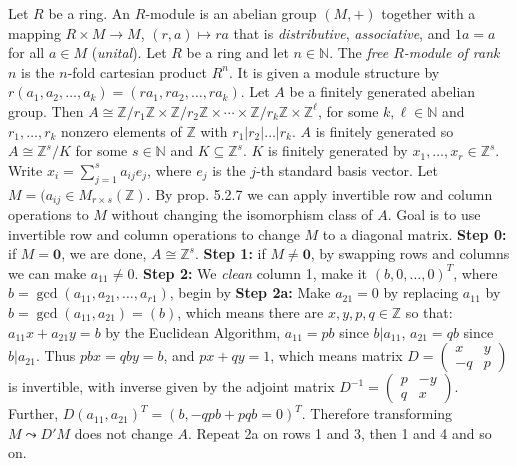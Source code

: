  Let $R$ be a ring. An $R$-module is an abelian group $(M,+)$ together with a mapping $R \times M \to M$, $(r, a)\mapsto ra$ that is \textit{distributive}, \textit{associative}, and $1a =a $ for all $a \in M$ (\textit{unital}).
 Let $R$ be a ring and let $n \in \mathbb{N}$. The \emph{free $R$-module of rank $n$} is the $n$-fold cartesian product $R^n$. It is given a module structure by $r(a_1, a_2, \ldots, a_k) = (ra_1, ra_2, \ldots, ra_k)$.
 Let $A$ be a finitely generated abelian group. Then $A \cong \mathbb{Z}/r_1\mathbb{Z} \times \mathbb{Z}/r_2\mathbb{Z} \times \cdots \times \mathbb{Z}/r_k\mathbb{Z} \times \mathbb{Z}^{\ell}$, for some $k,\ell \in \mathbb{N}$ and $r_1, \ldots, r_k$ nonzero elements of $\mathbb{Z}$ with $r_1|r_2|\ldots|r_k$.
\wpf{} $A$ is finitely generated so $A \cong \mathbb{Z}^s/K$ for some $s \in \mathbb{N}$ and $K \subseteq \mathbb{Z}^s$. $K$ is finitely generated by $x_1, \ldots, x_r \in \mathbb{Z}^s$. Write $x_i = \sum^s_{j=1} a_{ij}e_j$, where $e_j$ is the $j$-th standard basis vector. Let $M = (a_{ij} \in M_{r \times s}(\mathbb{Z})$. By prop. 5.2.7 we can apply invertible row and column operations to $M$ without changing the isomorphism class of $A$. Goal is to use invertible row and column operations to change $M$ to a diagonal matrix. 
\textbf{Step 0:} if $M = \mathbf{0}$, we are done, $A \cong \mathbb{Z}^s$.
\textbf{Step 1:} if $M \ne \mathbf{0}$, by swapping rows and columns we can make $a_{11} \ne 0$.
\textbf{Step 2:} We \textit{clean} column 1, make it $(b, 0, \ldots, 0)^T$, where $b = \gcd(a_{11}, a_{21}, \ldots, a_{r1})$, begin by
\textbf{Step 2a:} Make $a_{21} = 0$ by replacing $a_{11}$ by $b = \gcd(a_{11}, a_{21}) = (b)$, which means there are $x, y, p, q \in \mathbb{Z}$ so that: $a_{11}x + a_{21}y = b$ by the Euclidean Algorithm, $a_{11} = pb$ since $b|a_{11}$, $a_{21} = qb$ since $b|a_{21}$. Thus $pbx = qby = b$, and $px + qy = 1$, which means matrix $D = \begin{pmatrix}
    x & y \\
    -q & p
\end{pmatrix}$ is invertible, with inverse given by the adjoint matrix $D^{-1} = \begin{pmatrix}
    p & -y \\
    q & x
\end{pmatrix}$. Further, $D(a_{11}, a_{21})^T = (b, -qpb +pqb = 0)^T.$ Therefore transforming $M \leadsto D'M$ does not change $A$. Repeat 2a on rows 1 and 3, then 1 and 4 and so on. 
